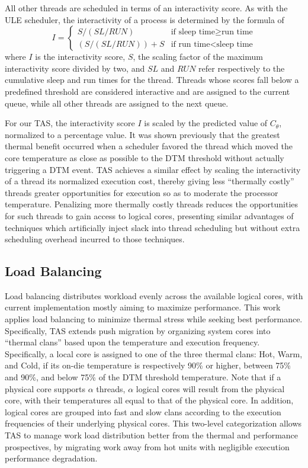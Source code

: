 \documentclass[times, 10pt,twocolumn]{IEEEtran}
\begin{document}
All other threads are scheduled in terms of an interactivity score.  As
with the ULE scheduler, the interactivity of a process is
determined by the formula of
\begin{equation}
\label{eq:interactsleeprun} 
I =   
\begin{cases}
  S / (SL/RUN) & \text{if sleep time} \geq \text{run time}\\
  (S/ (SL / RUN))+S & \text{if run time} < \text{sleep time}
\end{cases}
\end{equation}
where $I$ is the interactivity score, $S$, the scaling factor of the
maximum interactivity score divided by two, and $SL$ and $RUN$ refer
respectively to the cumulative sleep and run times for the thread.   
Threads whose scores fall below a predefined threshold are considered
interactive and are assigned to the current queue, while all other
threads are assigned to the next queue.

For our TAS, the interactivity score $I$ is scaled by the predicted
value of $C_{\theta}$, normalized to a percentage value.  It was shown
previously \cite{Zhou2010b} that the greatest thermal benefit occurred
when a scheduler favored the thread which moved the core temperature as
close as possible to the DTM threshold without actually triggering a DTM
event.  TAS achieves a similar effect by scaling the interactivity of a
thread its normalized execution cost, thereby giving less ``thermally
costly'' threads greater opportunities for execution so as to moderate
the processor temperature.  Penalizing more thermally costly threads
reduces the opportunities for such threads to gain access to logical
cores, presenting similar advantages of techniques which artificially
inject slack into thread scheduling but without extra scheduling
overhead incurred to those techniques.

\subsection{Load Balancing}
\label{sec:loadbalance} 
Load balancing distributes workload evenly across the available logical
cores, with current implementation mostly aiming to maximize
performance.  This work applies load balancing to minimize thermal
stress while seeking best performance.  Specifically, TAS extends push
migration by organizing system cores into ``thermal clans'' based upon
the temperature and execution frequency.  Specifically, a local core is
assigned to one of the three thermal clans: Hot, Warm, and Cold, if its
on-die temperature is respectively 90\% or higher, between 75\% and
90\%, and below 75\% of the DTM threshold temperature.  Note that if a
physical core supports $\alpha$ threads, $\alpha$ logical cores will
result from the physical core, with their temperatures all equal to that
of the physical core.  In addition, logical cores are grouped into fast
and slow clans according to the execution frequencies of their
underlying physical cores.  This two-level categorization allows TAS to
manage work load distribution better from the thermal and performance
prospectives, by migrating work away from hot units with negligible
execution performance degradation.
\end{document}
